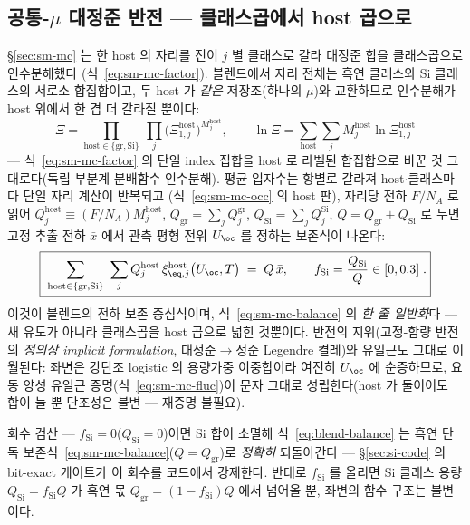 \subsection{공통-$\mu$ 대정준 반전 --- 클래스곱에서 host 곱으로}\label{ssec:blend-derivation}
\S\ref{sec:sm-mc} 는 한 host 의 자리를 전이 $j$ 별 클래스로 갈라 대정준 합을 클래스곱으로 인수분해했다
(식~\eqref{eq:sm-mc-factor}). 블렌드에서 자리 전체는 흑연 클래스와 Si 클래스의 서로소 합집합이고, 두
host 가 \emph{같은} 저장조(하나의 $\mu$)와 교환하므로 인수분해가 host 위에서 한 겹 더 갈라질 뿐이다:
\begin{equation}
\Xi=\prod_{\mathrm{host}\in\{\mathrm{gr},\mathrm{Si}\}}\ \prod_{j}\bigl(\Xi_{1,j}^{\mathrm{host}}\bigr)^{M_j^{\mathrm{host}}},
\qquad
\ln\Xi=\sum_{\mathrm{host}}\sum_{j}M_j^{\mathrm{host}}\ln\Xi_{1,j}^{\mathrm{host}}
\label{eq:blend-factor}
\end{equation}
--- 식~\eqref{eq:sm-mc-factor} 의 단일 index 집합을 host 로 라벨된 합집합으로 바꾼 것 그대로다(독립 부분계
분배함수 인수분해). 평균 입자수는 항별로 갈라져 host$\cdot$클래스마다 단일 자리 계산이 반복되고
(식~\eqref{eq:sm-mc-occ} 의 host 판), 자리당 전하 $F/N_A$ 로 읽어 $Q_j^{\mathrm{host}}\equiv(F/N_A)M_j^{\mathrm{host}}$,
$Q_\mathrm{gr}=\sum_jQ_j^{\mathrm{gr}}$, $Q_\mathrm{Si}=\sum_jQ_j^{\mathrm{Si}}$, $Q=Q_\mathrm{gr}+Q_\mathrm{Si}$
로 두면 고정 추출 전하 $\bar x$ 에서 관측 평형 전위 $U_\oc$ 를 정하는 보존식이 나온다:
\begin{equation}
\boxed{\;\sum_{\mathrm{host}\in\{\mathrm{gr},\mathrm{Si}\}}\ \sum_{j}Q_j^{\mathrm{host}}\,\xi_{\eq,j}^{\mathrm{host}}\bigl(U_\oc,T\bigr)\;=\;Q\,\bar x,
\qquad f_\mathrm{Si}=\frac{Q_\mathrm{Si}}{Q}\in[0,0.3]\;.}
\label{eq:blend-balance}
\end{equation}
이것이 블렌드의 전하 보존 중심식이며, 식~\eqref{eq:sm-mc-balance} 의 \emph{한 줄 일반화}다 --- 새 유도가
아니라 클래스곱을 host 곱으로 넓힌 것뿐이다. 반전의 지위(고정-함량 반전의 \emph{정의상 implicit
formulation}, 대정준$\to$정준 Legendre 켤레)와 유일근도 그대로 이월된다: 좌변은 강단조 logistic 의
용량가중 이중합이라 여전히 $U_\oc$ 에 순증하므로, 요동 양성 유일근 증명(식~\eqref{eq:sm-mc-fluc})이
문자 그대로 성립한다(host 가 둘이어도 합이 늘 뿐 단조성은 불변 --- 재증명 불필요).
\begin{verifybox}
회수 검산 --- $f_\mathrm{Si}=0$($Q_\mathrm{Si}{=}0$)이면 Si 합이 소멸해
식~\eqref{eq:blend-balance} 는 흑연 단독 보존식~\eqref{eq:sm-mc-balance}($Q{=}Q_\mathrm{gr}$)로 \emph{정확히}
되돌아간다 --- \S\ref{sec:si-code} 의 bit-exact 게이트가 이 회수를 코드에서 강제한다. 반대로 $f_\mathrm{Si}$
를 올리면 Si 클래스 용량 $Q_\mathrm{Si}=f_\mathrm{Si}Q$ 가 흑연 몫 $Q_\mathrm{gr}=(1-f_\mathrm{Si})Q$ 에서
넘어올 뿐, 좌변의 함수 구조는 불변이다.
\end{verifybox}

